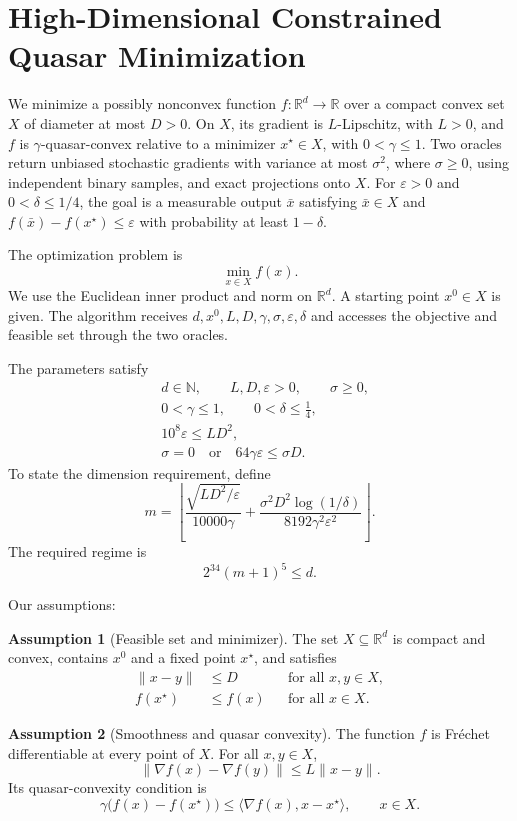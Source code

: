 \documentclass[10pt]{article}
\theoremstyle{definition}
\newtheorem{assumption}{Assumption}
\begin{document}
\section*{High-Dimensional Constrained Quasar Minimization}
We minimize a possibly nonconvex function $f:\mathbb{R}^d\to\mathbb{R}$ over a compact convex set $X$ of diameter at most $D>0$. On $X$, its gradient is $L$-Lipschitz, with $L>0$, and $f$ is $\gamma$-quasar-convex relative to a minimizer $x^\star\in X$, with $0<\gamma\leq1$. Two oracles return unbiased stochastic gradients with variance at most $\sigma^2$, where $\sigma\geq0$, using independent binary samples, and exact projections onto $X$. For $\varepsilon>0$ and $0<\delta\leq1/4$, the goal is a measurable output $\bar{x}$ satisfying $\bar{x}\in X$ and $f(\bar{x})-f(x^\star)\leq\varepsilon$ with probability at least $1-\delta$.

The optimization problem is
\[
\min_{x\in X} f(x).
\]
We use the Euclidean inner product and norm on $\mathbb{R}^d$. A starting point $x^0\in X$ is given. The algorithm receives $d,x^0,L,D,\gamma,\sigma,\varepsilon,\delta$ and accesses the objective and feasible set through the two oracles.

The parameters satisfy
\[
\begin{aligned}
&d\in\mathbb{N},\qquad L,D,\varepsilon>0,\qquad \sigma\geq0,\\
&0<\gamma\leq1,\qquad 0<\delta\leq\tfrac14,\\
&10^8\varepsilon\leq LD^2,\\
&\sigma=0\quad\text{or}\quad64\gamma\varepsilon\leq\sigma D.
\end{aligned}
\]
To state the dimension requirement, define
\[
m=\left\lfloor
\frac{\sqrt{LD^2/\varepsilon}}{10000\gamma}
+\frac{\sigma^2D^2\log(1/\delta)}{8192\gamma^2\varepsilon^2}
\right\rfloor.
\]
The required regime is
\[
2^{34}(m+1)^5\leq d.
\]

Our assumptions:
\begin{assumption}[Feasible set and minimizer]
The set $X\subseteq\mathbb{R}^d$ is compact and convex, contains $x^0$ and a fixed point $x^\star$, and satisfies
\[
\begin{aligned}
\|x-y\|&\leq D &&\text{for all }x,y\in X,\\
f(x^\star)&\leq f(x) &&\text{for all }x\in X.
\end{aligned}
\]
\end{assumption}

\begin{assumption}[Smoothness and quasar convexity]
The function $f$ is Fr\'echet differentiable at every point of $X$. For all $x,y\in X$,
\[
\|\nabla f(x)-\nabla f(y)\|\leq L\|x-y\|.
\]
Its quasar-convexity condition is
\[
\gamma\bigl(f(x)-f(x^\star)\bigr)
\leq\langle\nabla f(x),x-x^\star\rangle,
\qquad x\in X.
\]
\end{assumption}
\end{document}
